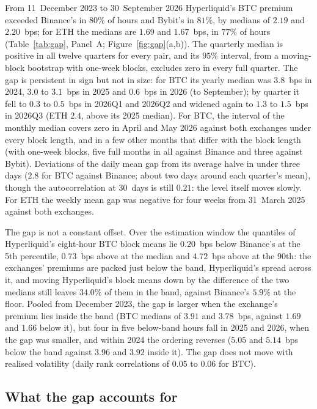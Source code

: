 \documentclass[10pt,a4paper]{article}
\begin{document}
From 11~December 2023 to 30~September 2026 Hyperliquid's BTC premium exceeded Binance's in $80\%$ of hours and Bybit's in $81\%$, by medians of $2.19$ and $2.20$~bps; for ETH the medians are $1.69$ and $1.67$~bps, in $77\%$ of hours (Table~\ref{tab:gap}, Panel~A; Figure~\ref{fig:gap}(a,b)). The quarterly median is positive in all twelve quarters for every pair, and its $95\%$ interval, from a moving-block bootstrap with one-week blocks, excludes zero in every full quarter. The gap is persistent in sign but not in size: for BTC its yearly median was $3.8$~bps in 2024, $3.0$ to $3.1$~bps in 2025 and $0.6$~bps in 2026 (to September); by quarter it fell to $0.3$ to $0.5$~bps in 2026Q1 and 2026Q2 and widened again to $1.3$ to $1.5$~bps in 2026Q3 (ETH $2.4$, above its 2025 median). For BTC, the interval of the monthly median covers zero in April and May 2026 against both exchanges under every block length, and in a few other months that differ with the block length (with one-week blocks, five full months in all against Binance and three against Bybit). Deviations of the daily mean gap from its average halve in under three days ($2.8$ for BTC against Binance; about two days around each quarter's mean), though the autocorrelation at 30~days is still $0.21$: the level itself moves slowly. For ETH the weekly mean gap was negative for four weeks from 31~March 2025 against both exchanges.

The gap is not a constant offset. Over the estimation window the quantiles of Hyperliquid's eight-hour BTC block means lie $0.20$~bps below Binance's at the 5th percentile, $0.73$~bps above at the median and $4.72$~bps above at the 90th: the exchanges' premiums are packed just below the band, Hyperliquid's spread across it, and moving Hyperliquid's block means down by the difference of the two medians still leaves $34.0\%$ of them in the band, against Binance's $5.9\%$ at the floor. Pooled from December 2023, the gap is larger when the exchange's premium lies inside the band (BTC medians of $3.91$ and $3.78$~bps, against $1.69$ and $1.66$ below it), but four in five below-band hours fall in 2025 and 2026, when the gap was smaller, and within 2024 the ordering reverses ($5.05$ and $5.14$~bps below the band against $3.96$ and $3.92$ inside it). The gap does not move with realised volatility (daily rank correlations of $0.05$ to $0.06$ for BTC).

\subsection{What the gap accounts for}
\end{document}
